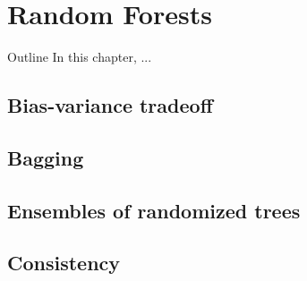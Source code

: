 \chapter{Random Forests}\label{ch:forest}

\begin{remark}{Outline}
In this chapter, ...
\end{remark}

\section{Bias-variance tradeoff}


\section{Bagging}




\section{Ensembles of randomized trees}






\section{Consistency}

